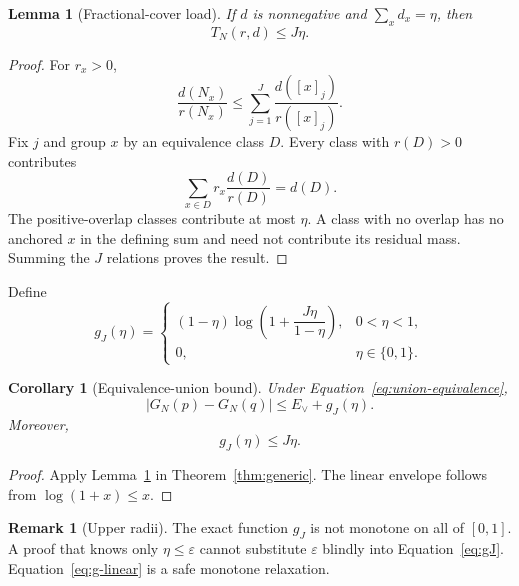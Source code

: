 \documentclass[11pt]{article}
\newtheorem{corollary}[theorem]{Corollary}
\newtheorem{lemma}[theorem]{Lemma}
\theoremstyle{definition}
\newtheorem{remark}[theorem]{Remark}
\begin{document}
\begin{lemma}[Fractional-cover load]\label{lem:fractional-cover}
If \(d\) is nonnegative and \(\sum_xd_x=\eta\), then
\begin{equation}
  T_N(r,d)\le J\eta.
\end{equation}
\end{lemma}

\begin{proof}
For \(r_x>0\),
\begin{equation}
  \frac{d(N_x)}{r(N_x)}
  \le
  \sum_{j=1}^{J}\frac{d([x]_j)}{r([x]_j)}.
\end{equation}
Fix \(j\) and group \(x\) by an equivalence class \(D\).  Every class with \(r(D)>0\) contributes
\begin{equation}
  \sum_{x\in D}r_x\frac{d(D)}{r(D)}=d(D).
\end{equation}
The positive-overlap classes contribute at most \(\eta\).  A class with no overlap has no anchored
\(x\) in the defining sum and need not contribute its residual mass.  Summing the \(J\) relations
proves the result.
\end{proof}

Define
\begin{equation}\label{eq:gJ}
  g_J(\eta)=
  \begin{cases}
    (1-\eta)\log\!\left(1+\dfrac{J\eta}{1-\eta}\right),
      &0<\eta<1,\\[6pt]
    0,&\eta\in\{0,1\}.
  \end{cases}
\end{equation}

\begin{corollary}[Equivalence-union bound]\label{cor:gJ}
Under Equation~\eqref{eq:union-equivalence},
\begin{equation}
  |G_N(p)-G_N(q)|\le E_\vee+g_J(\eta).
\end{equation}
Moreover,
\begin{equation}\label{eq:g-linear}
  g_J(\eta)\le J\eta.
\end{equation}
\end{corollary}

\begin{proof}
Apply Lemma~\ref{lem:fractional-cover} in Theorem~\ref{thm:generic}.  The linear envelope follows
from \(\log(1+x)\le x\).
\end{proof}

\begin{remark}[Upper radii]
The exact function \(g_J\) is not monotone on all of \([0,1]\).  A proof that knows only
\(\eta\le\varepsilon\) cannot substitute \(\varepsilon\) blindly into
Equation~\eqref{eq:gJ}.  Equation~\eqref{eq:g-linear} is a safe monotone relaxation.
\end{remark}
\end{document}
